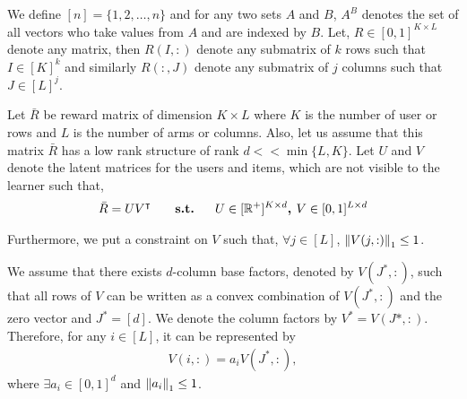 	
	We define $[n] = \lbrace 1,2,\ldots, n\rbrace$ and for any two sets $A$ and $B$, $A^B$ denotes the set of all vectors who take values from $A$ and are indexed by $B$. Let, $R\in [0,1]^{K\times L}$ denote any matrix, then $R(I,:)$ denote any submatrix of $k$ rows such that $I\in[K]^k$ and similarly $R(:,J)$ denote any submatrix of $j$ columns such that $J\in[L]^{j}$.
	
	Let $\bar{R}$ be reward matrix of  dimension $K\times L$ where $K$ is the number of user or rows and $L$ is the number of arms or columns. Also, let us assume that this matrix  $\bar{R}$ has a low rank structure of rank $d << \min\lbrace L,K\rbrace$. Let $U$ and $V$ denote the latent matrices for the users and items, which are not visible to the learner such that,
\begin{align*}
	\bar{R} = UV^{\intercal} \textbf{ \hspace*{4mm}   s.t.   \hspace*{4mm}} U\in [ \mathbb{R}^+ ]^{K\times d} \textbf{, } V\in  [0,1]^{L\times d} 
\end{align*}	  
	
	Furthermore, we put a constraint on $V$ such that, $\forall j\in [L]$, $ \left\lVert V(j,:)\right\rVert_1 \leq 1$. 
	
	
\begin{assumption}
\label{assm:1}
We assume that there exists $d$-column base factors, denoted by $V(J^*,:)$, such that all rows of $V$ can be written as a convex combination of $V(J^*,:)$ and the zero vector and $J^* = [d]$. We denote the column factors by $V^* = V(J*,:)$. Therefore, for any $i\in [L]$, it can be represented by
\begin{align*}
V(i,:) = a_i V(J^*,:) , 
\end{align*}
where $\exists a_i\in [0,1]^{d}$ and $ \left\lVert a_i\right\rVert_1 \leq 1$.
\end{assumption}



